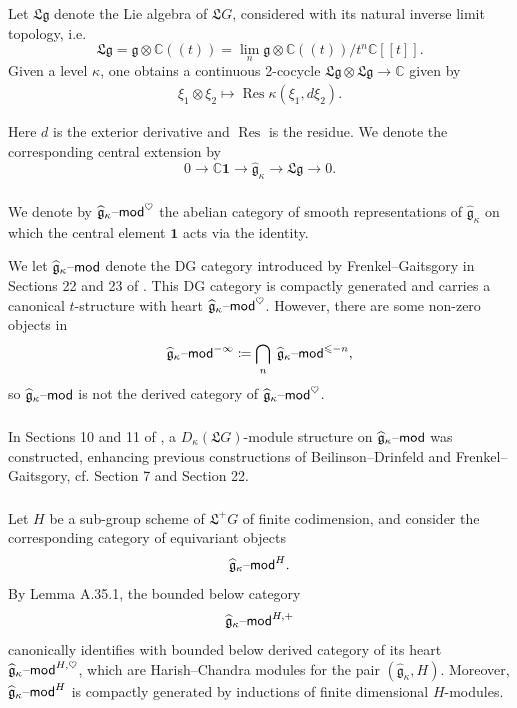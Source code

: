 \documentclass[11pt,reqno]{amsart}
\newcommand{\Res}{\operatorname{Res}}
\newcommand{\g}{\widehat{\mathfrak{g}}}
\newcommand{\fL}{\mathfrak{L}}
\newcommand{\fg}{\mathfrak{g}}
\newcommand{\gk}{\g_\kappa}
\theoremstyle{remark}
\numberwithin{equation}{section}
\renewcommand{\mod}{\text{\textendash}\mathsf{mod}}
\begin{document}
\subsubsection{}

Let $\fL \fg$ denote the 
Lie algebra of $\fL G$, considered with its natural
inverse limit topology, i.e. \[\fL \fg = \fg\otimes \mathbb{C}(\!(t)\!) = 
\lim_n \fg \otimes \mathbb{C}(\!(t)\!)/t^n \mathbb{C}[\![t]\!].\]
 Given a level $\kappa$, one obtains a continuous 2-cocycle $\fL \fg \otimes 
 \fL 
 \fg \to \mathbb{C}$ given by 
\[
\begin{gathered}
\xi_1 \otimes \xi_2 \mapsto 
\Res \kappa(\xi_1,d\xi_2).
\end{gathered}
\]

\noindent Here $d$ is the exterior derivative
and $\Res$ is the residue. We denote the corresponding central extension by
%
\[ 0 \rightarrow \mathbb{C} \mathbf{1} \rightarrow \gk \rightarrow \fL 
\fg 
\rightarrow 0.
\]
%

\subsubsection{}

We denote by $\gk\mod^{\heartsuit}$ the abelian category of 
smooth representations of $\gk$
on which the central element $\mathbf{1}$ acts via the identity. 

We let $\gk\mod$ denote the DG category introduced by
Frenkel--Gaitsgory in Sections 22 and 23 of \cite{fg}. 
This DG category is compactly generated and carries a canonical
$t$-structure with heart $\gk\mod^{\heartsuit}$. However,
there are some non-zero objects in \[\gk\mod^{-\infty} \coloneqq 
\bigcap_n \hspace{1mm} \gk\mod^{\leqslant -n},\]so $\gk\mod$ is not the derived
category of $\gk\mod^{\heartsuit}$.

\subsubsection{}

In Sections 10 and 11 of \cite{mys}, a $D_{\kappa}(\fL G)$-module
structure on $\gk\mod$ was constructed, 
enhancing previous constructions of Beilinson--Drinfeld
and Frenkel--Gaitsgory, cf. \cite{bdh} Section 7 and
\cite{fg2} Section 22.


\subsubsection{} Let $H$ be a sub-group scheme of $\fL^+ G$ of finite 
codimension, and consider the corresponding category of equivariant objects
%
\[
 \gk\mod^{H}. 
\]
%
By \cite{whit} Lemma A.35.1, the bounded below category
%
\[ \gk\mod^{H,+}\]
%
\noindent canonically identifies with bounded below derived category of its 
heart
$\gk\mod^{H,\heartsuit}$, which are Harish--Chandra modules for the pair $(\gk, 
H)$. Moreover, $\gk\mod^H$ is compactly generated by inductions of finite 
dimensional $H$-modules. 
\end{document}
